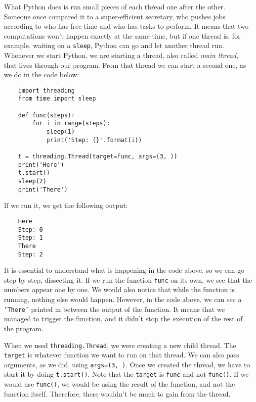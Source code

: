 What Python does is run small pieces of each thread one after the other. Someone once compared it to a super-efficient secretary, who pushes jobs according to who has free time and who has tasks to perform. It means that two computations won't happen exactly at the same time, but if one thread is, for example, waiting on a \texttt{sleep}, Python can go and let another thread run. Whenever we start Python, we are starting a thread, also called \emph{main thread}, that lives through our program. From that thread we can start a second one, as we do in the code below:

\begin{verbatim}
    import threading
    from time import sleep

    def func(steps):
        for i in range(steps):
            sleep(1)
            print('Step: {}'.format(i))

    t = threading.Thread(target=func, args=(3, ))
    print('Here')
    t.start()
    sleep(2)
    print('There')
\end{verbatim}

If we run it, we get the following output:

\begin{verbatim}
    Here
    Step: 0
    Step: 1
    There
    Step: 2
\end{verbatim}

It is essential to understand what is happening in the code above, so we can go step by step, dissecting it. If we run the function \texttt{func} on its own, we see that the numbers appear one by one. We would also notice that while the function is running, nothing else would happen. However, in the code above, we can see a \texttt{'There'} printed in between the output of the function. It means that we managed to trigger the function, and it didn't stop the execution of the rest of the program.

When we used \texttt{threading.Thread}, we were creating a new child thread. The \texttt{target} is whatever function we want to run on that thread. We can also pass arguments, as we did, using \texttt{args=(3, )}. Once we created the thread, we have to start it by doing \texttt{t.start()}. Note that the \texttt{target} is \texttt{func} and not \texttt{func()}. If we would use \texttt{func()}, we would be using the result of the function, and not the function itself. Therefore, there wouldn't be much to gain from the thread.


